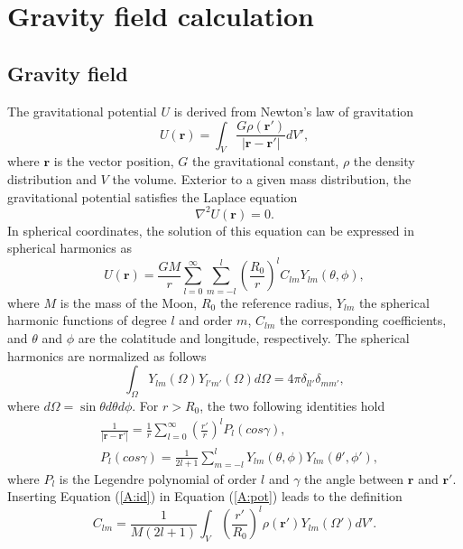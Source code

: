 \chapter{Gravity field calculation}
\label{chap:A1}

\section{Gravity field}


The gravitational potential $U$ is derived from Newton's law of gravitation
%
\begin{equation} \label{A:pot} U(\mathbf{r}) = \int_V
\frac{G\rho(\mathbf{r'})}{|\mathbf{r}-\mathbf{r'}|} dV', \end{equation} 
%
where $\mathbf{r}$ is the vector position, $G$ the gravitational constant, $\rho$ the density
distribution and $V$ the volume. Exterior to a given mass distribution, the gravitational potential
satisfies the Laplace equation
%
\begin{equation} \nabla^2 U(\mathbf{r}) = 0. \end{equation}
%
In spherical coordinates, the solution of this equation can be expressed in spherical
harmonics as
%
\begin{equation} U(\mathbf{r}) = \frac{GM}{r} \sum_{l=0}^{\infty} \sum_{m=-l}^{l}
\left(\frac{R_0}{r}\right)^{l} C_{lm} Y_{lm}(\theta,\phi), \label{potential.sh} \end{equation}
%
where $M$ is the mass of the Moon, $R_0$ the reference radius, $Y_{lm}$ the spherical harmonic
functions of degree $l$ and order $m$, $C_{lm}$ the corresponding coefficients, and $\theta$ and
$\phi$ are the colatitude and longitude, respectively. The spherical harmonics are normalized as
follows
%
\begin{equation} \int_\Omega Y_{lm}(\Omega)Y_{l'm'}(\Omega)d\Omega = 4\pi
\delta_{ll'}\delta_{mm'}, \end{equation}
%
where $d\Omega = \sin\theta d\theta d\phi$. For $r > R_0$, the two following identities hold
%
\begin{align} \label{A:id} &\frac{1}{|\mathbf{r}-\mathbf{r'}|} = \frac{1}{r}
\sum_{l=0}^{\infty} \left( \frac{r'}{r} \right)^l P_l(cos \gamma), \\ &P_l(cos\gamma) =
\frac{1}{2l+1} \sum_{m=-l}^l Y_{lm}(\theta,\phi)Y_{lm}(\theta',\phi'), \end{align} 
%
where $P_l$ is the Legendre polynomial of order $l$ and $\gamma$ the angle between $\mathbf{r}$ and
$\mathbf{r'}$. Inserting Equation (\ref{A:id}) in Equation (\ref{A:pot}) leads to the definition
%
\begin{equation} \label{eq:clm} C_{lm} = \frac{1}{M(2l+1)} \int_{V}
\left(\frac{r'}{R_0}\right)^{l} \rho(\mathbf{r'}) Y_{lm}(\Omega') dV'. \end{equation}

